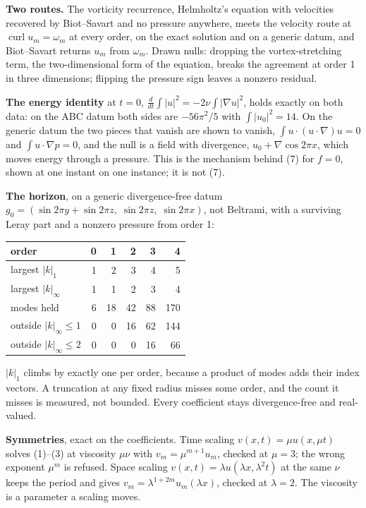 \textbf{Two routes.} The vorticity recurrence, Helmholtz's equation with velocities recovered by
Biot--Savart and no pressure anywhere, meets the velocity route at $\operatorname{curl}u_m = \omega_m$
at every order, on the exact solution and on a generic datum, and Biot--Savart returns $u_m$ from
$\omega_m$. Drawn nulls: dropping the vortex-stretching term, the two-dimensional form of the
equation, breaks the agreement at order 1 in three dimensions; flipping the pressure sign leaves a
nonzero residual.

\textbf{The energy identity} at $t=0$, $\frac{d}{dt}\int|u|^2 = -2\nu\int|\nabla u|^2$, holds
exactly on both data: on the ABC datum both sides are $-56\pi^2/5$ with $\int|u_0|^2 = 14$. On the
generic datum the two pieces that vanish are shown to vanish, $\int u\cdot(u\cdot\nabla)u = 0$ and
$\int u\cdot\nabla p = 0$, and the null is a field with divergence, $u_0 + \nabla\cos 2\pi x$, which
moves energy through a pressure. This is the mechanism behind (7) for $f = 0$, shown at one instant on
one instance; it is not (7).

\textbf{The horizon}, on a generic divergence-free datum
$g_0 = (\sin 2\pi y + \sin 2\pi z,\; \sin 2\pi z,\; \sin 2\pi x)$, not Beltrami, with a surviving
Leray part and a nonzero pressure from order 1:

\begin{center}
\begin{tabular}{@{}lrrrrr@{}}
\toprule
order & 0 & 1 & 2 & 3 & 4 \\
\midrule
largest $|k|_1$ & 1 & 2 & 3 & 4 & 5 \\
largest $|k|_\infty$ & 1 & 1 & 2 & 3 & 4 \\
modes held & 6 & 18 & 42 & 88 & 170 \\
outside $|k|_\infty \le 1$ & 0 & 0 & 16 & 62 & 144 \\
outside $|k|_\infty \le 2$ & 0 & 0 & 0 & 16 & 66 \\
\bottomrule
\end{tabular}
\end{center}

$|k|_1$ climbs by exactly one per order, because a product of modes adds their index vectors. A
truncation at any fixed radius misses some order, and the count it misses is measured, not bounded.
Every coefficient stays divergence-free and real-valued.

\textbf{Symmetries}, exact on the coefficients. Time scaling $v(x,t) = \mu u(x,\mu t)$ solves
(1)--(3) at viscosity $\mu\nu$ with $v_m = \mu^{m+1}u_m$, checked at $\mu = 3$; the wrong exponent
$\mu^m$ is refused. Space scaling $v(x,t) = \lambda u(\lambda x, \lambda^2 t)$ at the same $\nu$
keeps the period and gives $v_m = \lambda^{1+2m}u_m(\lambda x)$, checked at $\lambda = 2$. The
viscosity is a parameter a scaling moves.

